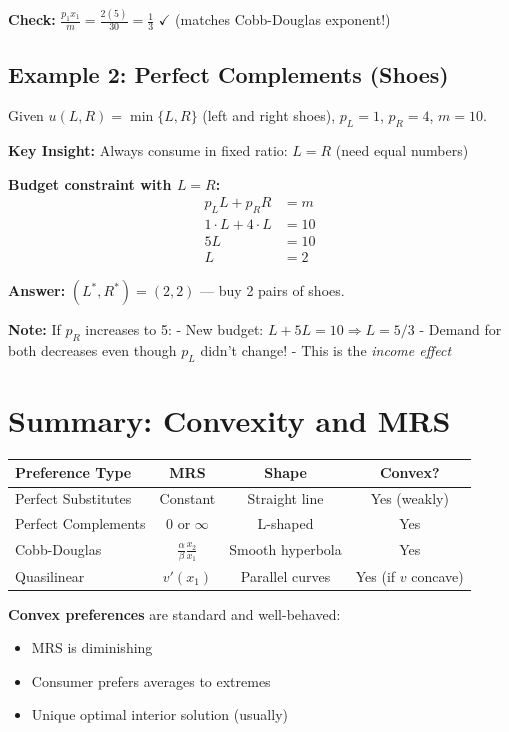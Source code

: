\documentclass[11pt,a4paper]{article}
\begin{document}
\textbf{Check:} $\frac{p_1 x_1}{m} = \frac{2(5)}{30} = \frac{1}{3}$ $\checkmark$ (matches Cobb-Douglas exponent!)

\subsection{Example 2: Perfect Complements (Shoes)}

Given $u(L, R) = \min\{L, R\}$ (left and right shoes), $p_L = 1$, $p_R = 4$, $m = 10$.

\textbf{Key Insight:} Always consume in fixed ratio: $L = R$ (need equal numbers)

\textbf{Budget constraint with $L = R$:}
\begin{align*}
p_L L + p_R R &= m\\
1 \cdot L + 4 \cdot L &= 10\\
5L &= 10\\
L &= 2
\end{align*}

\textbf{Answer:} $(L^*, R^*) = (2, 2)$ — buy 2 pairs of shoes.

\textbf{Note:} If $p_R$ increases to 5:
- New budget: $L + 5L = 10 \Rightarrow L = 5/3$
- Demand for both decreases even though $p_L$ didn't change!
- This is the \textit{income effect}

\section{Summary: Convexity and MRS}

\begin{center}
\begin{tabular}{|l|c|c|c|}
\hline
\textbf{Preference Type} & \textbf{MRS} & \textbf{Shape} & \textbf{Convex?} \\
\hline
Perfect Substitutes & Constant & Straight line & Yes (weakly) \\
Perfect Complements & 0 or $\infty$ & L-shaped & Yes \\
Cobb-Douglas & $\frac{\alpha}{\beta}\frac{x_2}{x_1}$ & Smooth hyperbola & Yes \\
Quasilinear & $v'(x_1)$ & Parallel curves & Yes (if $v$ concave) \\
\hline
\end{tabular}
\end{center}

\textbf{Convex preferences} are standard and well-behaved:
\begin{itemize}
\item MRS is diminishing
\item Consumer prefers averages to extremes
\item Unique optimal interior solution (usually)
\end{itemize}
\end{document}
